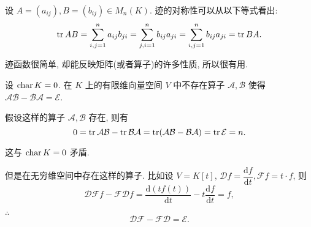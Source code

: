 \documentclass[color=black,device=normal,lang=cn,mode=geye]{elegantnote}
\begin{document}
设 $A=(a_{ij}),B=(b_{ij})\in M_n(K)$. 迹的对称性可以从以下等式看出:
\[\operatorname{tr} AB=\sum\limits_{i,j=1}^{n}a_{ij}b_{ji}=\sum\limits_{j,i=1}^{n}b_{ij}a_{ji}=\sum\limits_{i,j=1}^{n}b_{ij}a_{ji}=\operatorname{tr} BA.\]

迹函数很简单, 却能反映矩阵(或者算子)的许多性质, 所以很有用.
\begin{example}\label{exa2.5}
    设 $\operatorname{char} K=0$. 在 $K$ 上的有限维向量空间 $V$ 中不存在算子 $\mathcal{A},\mathcal{B}$ 使得 $\mathcal{AB}-\mathcal{BA}=\mathcal{E}$.

    假设这样的算子 $\mathcal{A},\mathcal{B}$ 存在, 则有
    \[0=\operatorname{tr}\mathcal{AB}-\operatorname{tr}\mathcal{BA}=\operatorname{tr}(\mathcal{AB}-\mathcal{BA})=\operatorname{tr}\mathcal{E}=n.\]

    这与 $\operatorname{char} K=0$ 矛盾.

    但是在无穷维空间中存在这样的算子. 比如设 $V=K[t]$, $\mathcal{D}f=\dfrac{\mathrm{d}f}{\mathrm{d}t},\mathcal{F}f=t\cdot f$, 则
    \[\mathcal{DF}f-\mathcal{FD}f=\dfrac{\mathrm{d}(tf(t))}{\mathrm{d}t}-t\dfrac{\mathrm{d}f}{\mathrm{d}t}=f,\]

    $\therefore$
    \[\mathcal{DF}-\mathcal{FD}=\mathcal{E}.\]
\end{example}
\end{document}
